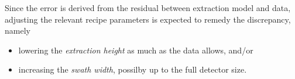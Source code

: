 Since the error is derived from the residual between extraction model and data, adjusting the relevant recipe parameters is expected to remedy the discrepancy, namely
\begin{itemize}
    \item lowering the \emph{extraction height} as much as the data allows, and/or
    \item increasing the \emph{swath width}, possilby up to the full detector size.
\end{itemize}

